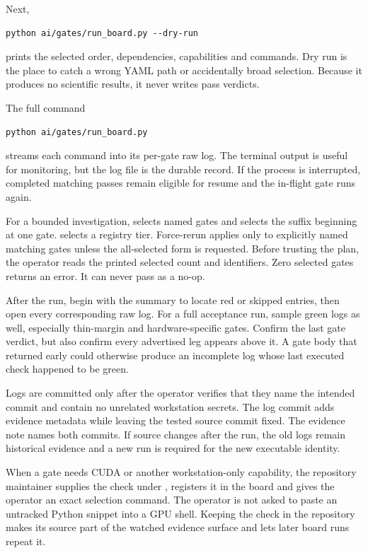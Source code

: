 Next,
\begin{verbatim}
python ai/gates/run_board.py --dry-run
\end{verbatim}
prints the selected order, dependencies, capabilities and commands.  Dry run
is the place to catch a wrong YAML path or accidentally broad selection.
Because it produces no scientific results, it never writes pass verdicts.

The full command
\begin{verbatim}
python ai/gates/run_board.py
\end{verbatim}
streams each command into its per-gate raw log.  The terminal output is useful
for monitoring, but the log file is the durable record.  If the process is
interrupted, completed matching passes remain eligible for resume and the
in-flight gate runs again.

For a bounded investigation,  selects named gates and
 selects the suffix beginning at one gate.  
selects a registry tier.  Force-rerun applies only to explicitly named
matching gates unless the all-selected form is requested.  Before trusting
the plan, the operator reads the printed selected count and identifiers.  Zero
selected gates returns an error.  It can never pass as a no-op.

After the run, begin with the summary to locate red or skipped entries, then
open every corresponding raw log.  For a full acceptance run, sample green
logs as well, especially thin-margin and hardware-specific gates.  Confirm
the last gate verdict, but also confirm every advertised leg appears above it.
A gate body that returned early could otherwise produce an incomplete log
whose last executed check happened to be green.

Logs are committed only after the operator verifies that they name the
intended commit and contain no unrelated workstation secrets.  The log commit
adds evidence metadata while leaving the tested source commit fixed.  The
evidence note names both commits.  If source changes after the run, the old logs
remain historical evidence and a new run is required for the new executable
identity.

When a gate needs CUDA or another workstation-only capability, the repository
maintainer supplies the check under , registers it in the
board and gives the operator an exact selection command.  The operator is not
asked to paste an untracked Python snippet into a GPU shell.  Keeping the
check in the repository makes its source part of the watched evidence surface
and lets later board runs repeat it.

